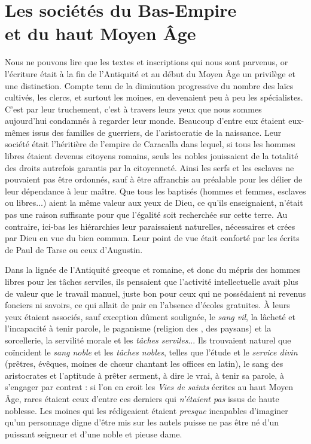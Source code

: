

\chapter[Les sociétés du Bas-Empire et du haut Moyen Âge]{Les sociétés du Bas-Empire\\et du haut Moyen Âge}


 Nous ne pouvons lire que les textes et inscriptions qui nous sont parvenus, or l'écriture était à la fin de l'Antiquité et au début du Moyen Âge un privilège et une distinction. Compte tenu de la diminution progressive du nombre des laïcs cultivés, les clercs, et surtout les moines, en devenaient peu à peu les spécialistes. C'est par leur truchement, c'est à travers leurs yeux que nous sommes aujourd'hui condamnés à regarder leur monde. Beaucoup d'entre eux étaient eux-mêmes issus des familles de guerriers, de l'aristocratie de la naissance. Leur société était l'héritière de l'empire de Caracalla dans lequel, si tous les hommes libres étaient devenus citoyens romains, seuls les nobles  jouissaient de la totalité des droits autrefois garantis par la citoyenneté. Ainsi les serfs et les esclaves ne pouvaient pas être ordonnés, sauf à être affranchis au préalable pour les délier de leur dépendance à leur maître. Que tous les baptisés (hommes et femmes, esclaves ou libres...) aient la même valeur aux yeux de Dieu, ce qu'ils enseignaient, n'était pas une raison suffisante pour que l'égalité soit recherchée sur cette terre. Au contraire, ici-bas les hiérarchies leur paraissaient naturelles, nécessaires et crées par Dieu en vue du bien commun. Leur point de vue était conforté par les écrits de Paul de Tarse ou ceux d'Augustin.

 Dans la lignée de l'Antiquité grecque et romaine, et donc du mépris des hommes libres pour les tâches serviles, ils pensaient que l'activité intellectuelle avait plus de valeur que le travail manuel, juste bon pour ceux qui ne possédaient ni revenus fonciers ni savoirs, ce qui allait de pair en l'absence d'écoles gratuites. À leurs yeux étaient associés, sauf exception dûment soulignée, le \emph{sang vil}, la lâcheté et l'incapacité à tenir parole, le paganisme (religion des , des paysans) et la sorcellerie, la servilité morale et les \emph{tâches serviles}... Ils trouvaient naturel que coïncident le \emph{sang noble} et les \emph{tâches nobles}, telles que l'étude et le \emph{service divin} (prêtres, évêques, moines de chœur chantant les offices en latin), le sang des aristocrates et l'aptitude à prêter serment, à dire le vrai, à tenir sa parole, à s'engager par contrat : si l'on en croit les \emph{Vies de saints} écrites au haut Moyen Âge, rares étaient ceux d'entre ces derniers qui \emph{n'étaient pas} issus de haute noblesse. Les moines qui les rédigeaient étaient \emph{presque} incapables d'imaginer qu'un personnage digne d'être mis sur les autels puisse ne pas être né d'un puissant seigneur et d'une noble et pieuse dame. 


